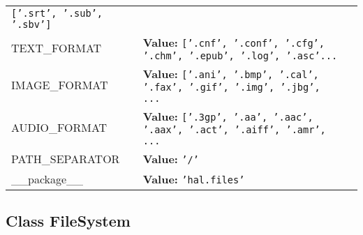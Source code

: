 \begin{longtable}{|p{\varnamewidth}|p{\vardescrwidth}|l}
{\tt \texttt{[}\texttt{'}\texttt{.srt}\texttt{'}\texttt{, }\texttt{'}\texttt{.sub}\texttt{'}\texttt{, }\texttt{'}\texttt{.sbv}\texttt{'}\texttt{]}}&\\
\cline{1-2}
\raggedright T\-E\-X\-T\-\_\-F\-O\-R\-M\-A\-T\- & \raggedright \textbf{Value:} 
{\tt \texttt{[}\texttt{'}\texttt{.cnf}\texttt{'}\texttt{, }\texttt{'}\texttt{.conf}\texttt{'}\texttt{, }\texttt{'}\texttt{.cfg}\texttt{'}\texttt{, }\texttt{'}\texttt{.chm}\texttt{'}\texttt{, }\texttt{'}\texttt{.epub}\texttt{'}\texttt{, }\texttt{'}\texttt{.log}\texttt{'}\texttt{, }\texttt{'}\texttt{.asc}\texttt{'}\texttt{...}}&\\
\cline{1-2}
\raggedright I\-M\-A\-G\-E\-\_\-F\-O\-R\-M\-A\-T\- & \raggedright \textbf{Value:} 
{\tt \texttt{[}\texttt{'}\texttt{.ani}\texttt{'}\texttt{, }\texttt{'}\texttt{.bmp}\texttt{'}\texttt{, }\texttt{'}\texttt{.cal}\texttt{'}\texttt{, }\texttt{'}\texttt{.fax}\texttt{'}\texttt{, }\texttt{'}\texttt{.gif}\texttt{'}\texttt{, }\texttt{'}\texttt{.img}\texttt{'}\texttt{, }\texttt{'}\texttt{.jbg}\texttt{'}\texttt{, }\texttt{...}}&\\
\cline{1-2}
\raggedright A\-U\-D\-I\-O\-\_\-F\-O\-R\-M\-A\-T\- & \raggedright \textbf{Value:} 
{\tt \texttt{[}\texttt{'}\texttt{.3gp}\texttt{'}\texttt{, }\texttt{'}\texttt{.aa}\texttt{'}\texttt{, }\texttt{'}\texttt{.aac}\texttt{'}\texttt{, }\texttt{'}\texttt{.aax}\texttt{'}\texttt{, }\texttt{'}\texttt{.act}\texttt{'}\texttt{, }\texttt{'}\texttt{.aiff}\texttt{'}\texttt{, }\texttt{'}\texttt{.amr}\texttt{'}\texttt{, }\texttt{...}}&\\
\cline{1-2}
\raggedright P\-A\-T\-H\-\_\-S\-E\-P\-A\-R\-A\-T\-O\-R\- & \raggedright \textbf{Value:} 
{\tt \texttt{'}\texttt{/}\texttt{'}}&\\
\cline{1-2}
\raggedright \_\-\_\-p\-a\-c\-k\-a\-g\-e\-\_\-\_\- & \raggedright \textbf{Value:} 
{\tt \texttt{'}\texttt{hal.files}\texttt{'}}&\\
\cline{1-2}
\end{longtable}



\subsection{Class FileSystem}

